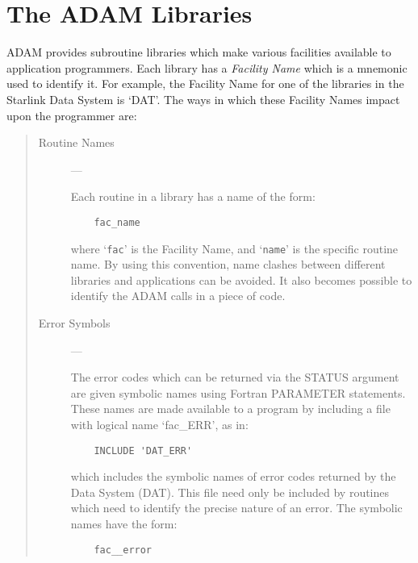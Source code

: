 \chapter{The ADAM Libraries}
\label{C_overlibs}

ADAM provides subroutine libraries which make various facilities available
to application programmers.
Each library has a {\em Facility Name} which is a mnemonic used to identify it.
For example, the Facility Name for one of the libraries in the Starlink Data
System is `DAT'.
The ways in which these Facility Names impact upon the programmer are:
\begin{quote}
\begin{description}
\item [Routine Names] ---

Each routine in a library has a name of the form:

\begin{small}
\begin{verbatim}
    fac_name
\end{verbatim}
\end{small}

where `{\tt fac}' is the Facility Name, and `{\tt name}' is the specific routine
name.
By using this convention, name clashes between different libraries and
applications can be avoided.
It also becomes possible to identify the ADAM calls in a piece of code.

\item [Error Symbols] ---

The error codes which can be returned via the STATUS argument are given
symbolic names using Fortran PARAMETER statements.
These names are made available to a program by including a file with logical
name `fac\_ERR', as in:

\begin{small}
\begin{verbatim}
    INCLUDE 'DAT_ERR'
\end{verbatim}
\end{small}

which includes the symbolic names of error codes returned by the Data System
(DAT).
This file need only be included by routines which need to identify the precise
nature of an error.
The symbolic names have the form:

\begin{small}
\begin{verbatim}
    fac__error
\end{verbatim}
\end{small}


\end{description}
\end{quote}
